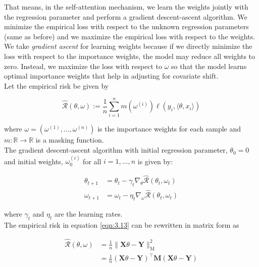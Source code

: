 That means, in the self-attention mechanism, we learn the weights jointly with the regression parameter and perform a gradient descent-ascent algorithm. We minimize the empirical loss with respect to the unknown regression parameters (same as before) and we maximize the empirical loss with respect to the weights. We take \emph{gradient ascent} for learning weights because if we directly minimize the loss with respect to the importance weights, the model may reduce all weights to zero. Instead, we maximize the loss with respect to $\omega$ so that the model learns optimal importance weights that help in adjusting for covariate shift.\\

Let the empirical risk be given by

\begin{equation}
    \hat{\mathcal{R}}(\theta, \omega) := \frac{1}{n} \sum_{i=1}^n m(\omega^{(i)})\ell (y_i, \langle \theta, x_i \rangle)
    \label{eqn:3.13}
\end{equation}

where $\omega = (\omega^{(1)}, \ldots, \omega^{(n)})$ is the importance weights for each sample and $m: \mathbb{R} \to \mathbb{R}$ is a masking function.\\

The gradient descent-ascent algorithm with initial regression parameter, $\theta_0 = 0$ and initial weights, $\omega^{(i)}_0$ for all $i = 1, \ldots, n$ is given by:

\begin{equation}
    \begin{aligned}
        \theta_{t+1} &= \theta_t - \gamma_t \nabla_{\theta} \hat{\mathcal{R}}(\theta_t, \omega_t)\\
        \omega_{t+1} &= \omega_t - \eta_t \nabla_{\omega} \hat{\mathcal{R}}(\theta_t, \omega_t)
    \end{aligned}
    \label{eqn:3.14}
\end{equation}

where $\gamma_t$ and $\eta_t$ are the learning rates.\\

The empirical risk in equation \ref{eqn:3.13} can be rewritten in matrix form as

\begin{equation}
    \begin{aligned}
        \hat{\mathcal{R}}(\theta, \omega) &= \frac{1}{n} \lVert \mathbf{X}\theta - \mathbf{Y}\rVert_{\text{M}}^2\\
        &= \frac{1}{n} (\mathbf{X}\theta - \mathbf{Y})^\top \mathbf{M}(\mathbf{X}\theta - \mathbf{Y})
    \end{aligned}
    \label{eqn:3.15}
\end{equation}

